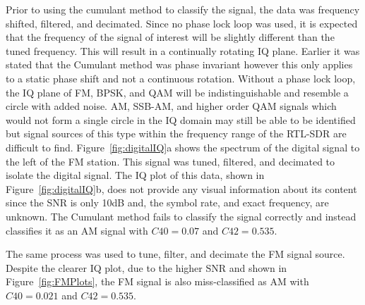 Prior to using the cumulant method to classify the signal, the data was
frequency shifted, filtered, and decimated.  Since no phase lock loop was used,
it is expected that the frequency of the signal of interest will be slightly
different than the tuned frequency.  This will result in a continually rotating
IQ plane.
Earlier it was stated that the Cumulant method was phase invariant however this
only applies to a static phase shift and not a continuous rotation.  Without a phase
lock loop, the IQ plane of FM, BPSK, and QAM will be indistinguishable and
resemble a circle with added noise.
AM, SSB-AM, and higher order QAM signals which would not form a single circle in
the IQ domain may still be able to be identified but signal sources of this type
within the frequency range of the RTL-SDR are difficult to find.
Figure~\ref{fig:digitalIQ}a shows the spectrum of the digital signal to the
left of the FM station.  This signal was tuned, filtered, and decimated to
isolate the digital signal.  The IQ plot of this data, shown in
Figure~\ref{fig:digitalIQ}b, does not provide any visual information about its
content since the SNR is only 10dB and, the symbol rate, and exact
frequency, are unknown.  The Cumulant method fails to classify the signal
correctly and instead classifies it as an AM signal with $C40 = 0.07$ and $C42 = 0.535$.

The same process was used to tune, filter, and decimate the FM signal source. 
Despite the clearer IQ plot, due to the higher SNR and shown in
Figure~\ref{fig:FMPlots}, the FM signal is also miss-classified as AM with $C40 = 0.021$ and $C42 =  0.535$.

